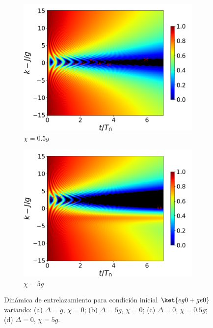 \begin{figure}[h!]
    \begin{subfigure}{0.49\textwidth}
        \includegraphics[width=\textwidth]{figuras/ch4/concu/k/eg0+ge0 d=0.0g x=0.5g J=15.0g gamma=0.25g concu k dis.png}
        \caption{$\chi=0.5g$}
        \label{fig4:concu k x1}
    \end{subfigure}
    \hfill
    \begin{subfigure}{0.49\textwidth}
        \includegraphics[width=\textwidth]{figuras/ch4/concu/k/eg0+ge0 d=0.0g x=5.0g J=15.0g gamma=0.25g concu k dis.png}
        \caption{$\chi=5g$}
        \label{fig4:concu k x2}
    \end{subfigure}
    \caption{Dinámica de entrelazamiento para condición inicial $\ket{eg0+ge0}$ variando: (a) $\Delta=g$, $\chi=0$; (b) $\Delta=5g$, $\chi=0$; (c) $\Delta=0$, $\chi=0.5g$; (d) $\Delta=0$, $\chi=5g$.}
    \label{fig4:concu k params}
\end{figure}

